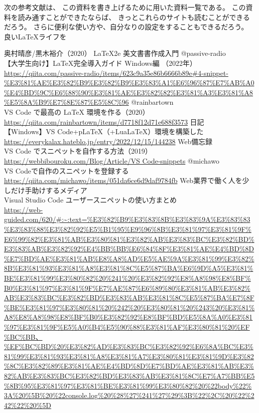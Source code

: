\documentclass{ltjsarticle}
\begin{document}
次の参考文献は、
この資料を書き上げるために用いた資料一覧である。
この資料を読み通すことができたならば、
きっとこれらのサイトも読むことができるだろう。
さらに便利な使い方や、自分なりの設定をすることもできるだろう。
良い\LaTeX ライフを
\begin{thebibliography}{999}
  奥村晴彦/黒木裕介（2020）
  \LaTeX 2e 美文書書作成入門
  @passive-radio\\
  【大学生向け】LaTeX完全導入ガイド Windows編 （2022年）\\
  \url{https://qiita.com/passive-radio/items/623c9a35e86b6666b89e#4-snippet-%E3%81%AE%E3%82%B9%E3%82%B9%E3%83%A1%E6%96%87%E7%AB%A0%E4%BD%9C%E6%88%90%E3%81%AE%E3%82%82%E3%81%A3%E3%81%A8%E5%8A%B9%E7%8E%87%E5%8C%96}
  @rainbartown\\
  VS Code で最高の LaTeX 環境を作る（2020）
  \url{https://qiita.com/rainbartown/items/d7718f12d71e688f3573}
  日記\\
  【Windows】VS Code+pLaTeX（+LuaLaTeX）環境を構築した\\
  \url{https://everykalax.hateblo.jp/entry/2022/12/15/144238}
  Web備忘録\\
  VS Code でスニペットを自作する方法（2019）\\
  \url{https://webbibouroku.com/Blog/Article/VS Code-snippets}
  @michawo\\
  VS Codeで自作のスニペットを登録する\\
  \url{https://qiita.com/michawo/items/051da6ce6d9daf9784fb}
  Web業界で働く人を少しだけ手助けするメディア\\
  Visual Studio Code ユーザースニペットの使い方まとめ\\
  \url{https://web-guided.com/620/#:~:text=%E3%82%B9%E3%83%8B%E3%83%9A%E3%83%83%E3%83%88%E3%82%92%E5%B1%95%E9%96%8B%E3%81%97%E3%81%9F%E6%99%82%E3%81%AB%E3%80%81%E3%82%AB%E3%83%BC%E3%82%BD%E3%83%AB%E3%82%92%E4%BB%BB%E6%84%8F%E3%81%AE%E4%BD%8D%E7%BD%AE%E3%81%AB%E8%A8%AD%E5%AE%9A%E3%81%99%E3%82%8B%E3%81%93%E3%81%A8%E3%81%8C%E5%87%BA%E6%9D%A5%E3%81%BE%E3%81%99%E3%80%82%20%241%20%E3%82%92%E8%A8%98%E8%BF%B0%E3%81%97%E3%81%9F%E7%AE%87%E6%89%80%E3%81%AB%E3%82%AB%E3%83%BC%E3%82%BD%E3%83%AB%E3%81%8C%E5%87%BA%E7%8F%BE%E3%81%97%E3%80%81%20%242%20%E3%80%81%20%243%20%E3%81%A8%E8%A8%98%E8%BF%B0%E3%82%92%E8%BF%BD%E5%8A%A0%E3%81%97%E3%81%9F%E5%A0%B4%E5%90%88%E3%81%AF%E3%80%81%20%EF%BC%BB、%EF%BC%BD%20%E3%82%AD%E3%83%BC%E3%82%92%E6%8A%BC%E3%81%99%E3%81%93%E3%81%A8%E3%81%A7%E3%80%81%E3%81%9D%E3%82%8C%E3%82%89%E3%81%AE%E4%BD%8D%E7%BD%AE%E3%81%AB%E3%82%AB%E3%83%BC%E3%82%BD%E3%83%AB%E3%81%8C%E7%A7%BB%E5%8B%95%E3%81%97%E3%81%BE%E3%81%99%E3%80%82%20%22body%22%3A%20%5B%20%22console.log%20%28%27%241%27%29%3B%22%2C%20%22%242%22%20%5D}

\end{thebibliography}
\end{document}
